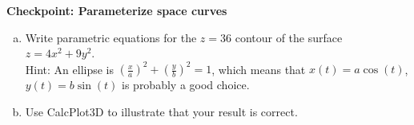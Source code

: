 \documentclass[12pt]{article}
\renewcommand{\section}[1]{\begin{center} \textbf{#1} \\\end{center}}
\begin{document}
%


\allowdisplaybreaks
\section{Checkpoint: Parameterize space curves}

\begin{enumerate}[(a)]
    \item Write parametric equations for the $z=36$ contour of the surface $z=4x^2+9y^2$.\\
    Hint: An ellipse is $\displaystyle\left(\frac{x}{a}\right)^2 + \left(\frac{y}{b}\right)^2 = 1$, which means that $x(t) = a \cos(t)$, $y(t) = b\sin(t)$ is probably a good choice.
    \item Use CalcPlot3D to illustrate that your result is correct.
\end{enumerate}




	
\end{document}
